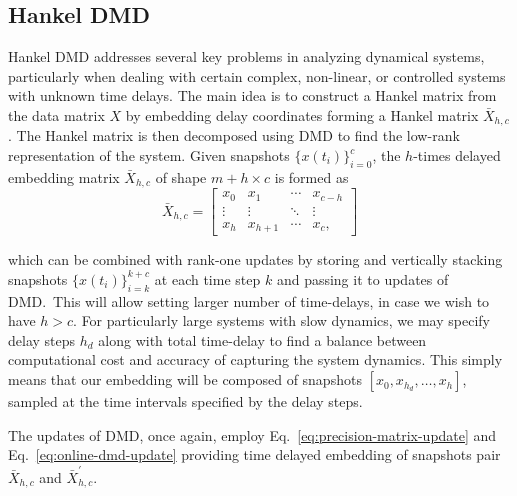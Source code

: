 \subsection{Hankel DMD}\label{sec:hankel-dmd}
Hankel DMD addresses several key problems in analyzing dynamical systems, particularly when dealing with certain complex, non-linear, or controlled systems with unknown time delays. The main idea is to construct a Hankel matrix from the data matrix \(X\) by embedding delay coordinates forming a Hankel matrix \(\bar{X}_{h, c}\). The Hankel matrix is then decomposed using DMD to find the low-rank representation of the system. Given snapshots \({\{x(t_i)\}}^c_{i=0}\), the \(h\)-times delayed embedding matrix \(\bar{X}_{h, c}\) of shape \(m + h \times c\) is formed as
\begin{equation}\label{eq:hankel}
	\bar{X}_{h, c} = \begin{bmatrix}
		x_0    & x_1       & \cdots & x_{c - h} \\
		\vdots & \vdots    & \ddots & \vdots    \\
		x_{h}  & x_{h + 1} & \cdots & x_{c},
	\end{bmatrix}
\end{equation}

which can be combined with rank-one updates by storing and vertically stacking snapshots \({\{x(t_i)\}}^{k+c}_{i=k}\) at each time step \(k\) and passing it to updates of DMD.~This will allow setting larger number of time-delays, in case we wish to have \(h > c\). For particularly large systems with slow dynamics, we may specify delay steps \(h_d\) along with total time-delay to find a balance between computational cost and accuracy of capturing the system dynamics. This simply means that our embedding will be composed of snapshots \( [x_0, x_{h_d}, \ldots, x_h] \), sampled at the time intervals specified by the delay steps.

The updates of DMD, once again, employ Eq.~\eqref{eq:precision-matrix-update} and Eq.~\eqref{eq:online-dmd-update}  providing time delayed embedding of snapshots pair \(\bar{X}_{h, c}\) and \(\bar{X}^\prime_{h, c}\).
